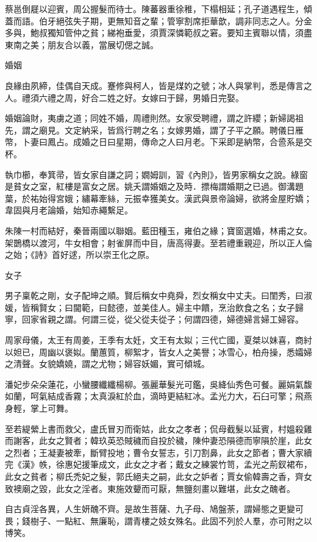 \documentclass[12pt,a4paper]{ctexbook}
\begin{document}
蔡邕倒屣以迎賓，周公握髮而待士。陳蕃器重徐稚，下榻相延；孔子道遇程生，傾蓋而語。伯牙絕弦失子期，更無知音之輩；管寧割席拒華歆，調非同志之人。分金多與，鮑叔獨知管仲之貧；綈袍垂愛，須賈深憐範叔之窘。要知主賓聯以情，須盡東南之美；朋友合以義，當展切偲之誠。\par
婚姻\par
良緣由夙締，佳偶自天成。蹇修與柯人，皆是煤妁之號；冰人與掌判，悉是傳言之人。禮須六禮之周，好合二姓之好。女嫁曰于歸，男婚日完娶。\par
婚姻論財，夷虜之道；同姓不婚，周禮則然。女家受聘禮，謂之許纓；新婦謁祖先，謂之廟見。文定納采，皆爲行聘之名；女嫁男婚，謂了子平之願。聘儀日雁幣，卜妻曰鳳占。成婚之日曰星期，傳命之人曰月老。下采即是納幣，合巹系是交杯。\par
執巾櫛，奉箕帚，皆女家自謙之詞；嫺姆訓，習《內則》，皆男家稱女之說。綠窗是貧女之室，紅樓是富女之居。姚夭謂婚姻之及時．摽梅謂婚期之已過。御溝題葉，於祐始得宮娥；繡幕牽絲，元振幸獲美女。漢武與景帝論婦，欲將金屋貯嬌；韋固與月老論婚，始知赤繩繫足。\par
朱陳一村而結好，秦晉兩國以聯姻。藍田種玉，雍伯之緣；寶窗選婚，林甫之女。架鵲橋以渡河，牛女相會；射雀屏而中目，唐高得妻。至若禮重親迎，所以正人倫之始；《詩》首好逑，所以崇王化之原。\par
女子\par
男子稟乾之剛，女子配坤之順。賢后稱女中堯舜，烈女稱女中丈夫。曰閨秀，曰淑媛，皆稱賢女；曰閫範，曰懿德，並美佳人。婦主中饋，烹治飲食之名；女子歸寧，回家省親之謂。何謂三從，從父從夫從子；何謂四德，婦德婦言婦工婦容。\par
周家母儀，太王有周姜，王季有太妊，文王有太姒；三代亡國，夏桀以妹喜，商紂以妲已，周幽以褒姒。蘭蕙質，柳絮才，皆女人之美譽；冰雪心，柏舟操，悉孀婦之清聲。女貌嬌嬈，謂之尤物；婦容妖媚，實可傾城。\par
潘妃步朵朵蓮花，小蠻腰纖纖楊柳。張麗華髮光可鑑，吳絳仙秀色可餐。麗娟氣馥如蘭，呵氣結成香霧；太真淚紅於血，滴時更結紅冰。孟光力大，石臼可擎；飛燕身輕，掌上可舞。\par
至若緹縈上書而救父，盧氏冒刃而衛姑，此女之孝者；侃母截髮以延賓，村媼殺雞而謝客，此女之賢者；韓玖英恐賊穢而自投於穢，陳仲妻恐隕德而寧隕於崖，此女之烈者；王凝妻被牽，斷臂投地；曹令女誓志，引刀割鼻，此女之節者；曹大家續完《漢》帙，徐惠妃援筆成文，此女之才者；戴女之練裳竹笥，孟光之荊釵裙布，此女之貧者；柳氏禿妃之髮，郭氏絕夫之嗣，此女之妒者；賈女偷韓壽之香，齊女致襖廟之毀，此女之淫者。東施效顰而可厭，無鹽刻畫以難堪，此女之醜者。\par
自古貞淫各異，人生妍醜不齊。是故生菩薩、九子母、鳩盤荼，謂婦態之更變可畏；錢樹子、一點紅、無廉恥，謂青樓之妓女殊名。此固不列於人羣，亦可附之以博笑。\par
\end{document}
